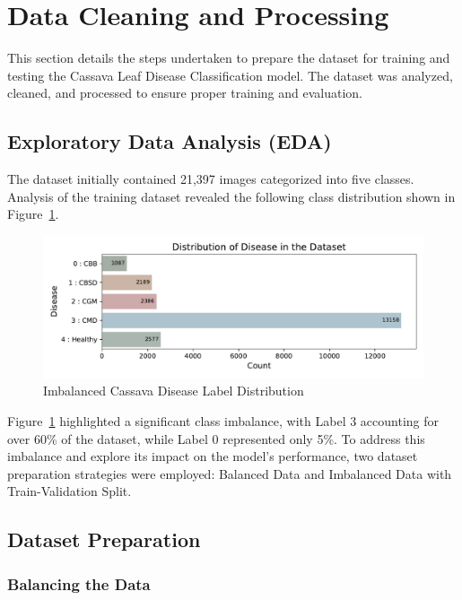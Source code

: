\section{Data Cleaning and Processing}
This section details the steps undertaken to prepare the dataset for training and testing the Cassava Leaf Disease Classification model. The dataset was analyzed, cleaned, and processed to ensure proper training and evaluation. 

\subsection{\textbf{Exploratory Data Analysis (EDA)}}
The dataset initially contained 21,397 images categorized into five classes. Analysis of the training dataset revealed the following class distribution shown in Figure~\ref{fig:ImbalancedData}.

\begin{figure}[t]
    \centering
    \includegraphics[width=1\linewidth]{graphs/overview/Distribution of Disease in the Dataset.pdf}
    \caption{Imbalanced Cassava Disease Label Distribution}
    \label{fig:ImbalancedData}
\end{figure}

Figure~\ref{fig:ImbalancedData} highlighted a significant class imbalance, with Label 3 accounting for over 60\% of the dataset, while Label 0 represented only 5\%. To address this imbalance and explore its impact on the model’s performance, two dataset preparation strategies were employed: Balanced Data and Imbalanced Data with Train-Validation Split.

\subsection{\textbf{Dataset Preparation }}
\subsubsection{Balancing the Data}

